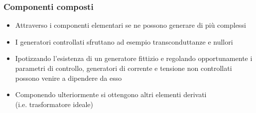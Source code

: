 \begin{frame}
 \frametitle{Componenti composti}

 \begin{itemize}
  \item<1-> Attraverso i componenti elementari se ne possono generare di più complessi
  \item<2-> I generatori controllati sfruttano ad esempio transconduttanze e nullori
  \item<3-> Ipotizzando l'esistenza di un generatore fittizio e regolando opportunamente i parametri di controllo, generatori di corrente e tensione non controllati possono venire a dipendere da esso
  \item<4-> Componendo ulteriormente si ottengono altri elementi derivati\\ (i.e. trasformatore ideale)
 \end{itemize}


\end{frame}
